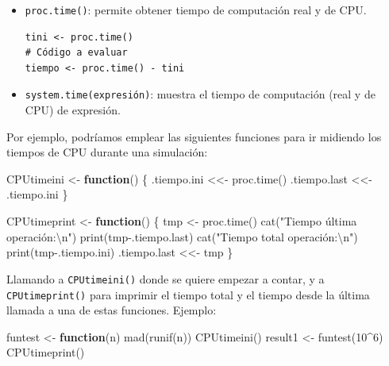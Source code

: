\documentclass[
]{book}
\newenvironment{Shaded}{\begin{snugshade}}{\end{snugshade}}
\newcommand{\ControlFlowTok}[1]{\textcolor[rgb]{0.13,0.29,0.53}{\textbf{#1}}}
\newcommand{\DecValTok}[1]{\textcolor[rgb]{0.00,0.00,0.81}{#1}}
\newcommand{\FunctionTok}[1]{\textcolor[rgb]{0.00,0.00,0.00}{#1}}
\newcommand{\NormalTok}[1]{#1}
\newcommand{\OtherTok}[1]{\textcolor[rgb]{0.56,0.35,0.01}{#1}}
\newcommand{\SpecialCharTok}[1]{\textcolor[rgb]{0.00,0.00,0.00}{#1}}
\newcommand{\StringTok}[1]{\textcolor[rgb]{0.31,0.60,0.02}{#1}}
\theoremstyle{break}
\theoremstyle{definition}
\theoremstyle{definition}
\theoremstyle{definition}
\theoremstyle{definition}
\theoremstyle{remark}
\begin{document}
\begin{itemize}
\item
  \texttt{proc.time()}: permite obtener tiempo de computación real y de
  CPU.

\begin{verbatim}
tini <- proc.time()
# Código a evaluar
tiempo <- proc.time() - tini
\end{verbatim}
\item
  \texttt{system.time(expresión)}: muestra el tiempo de computación (real y
  de CPU) de expresión.
\end{itemize}

Por ejemplo, podríamos emplear las siguientes funciones para
ir midiendo los tiempos de CPU durante una simulación:

\begin{Shaded}
\begin{Highlighting}[]
\NormalTok{CPUtimeini }\OtherTok{\textless{}{-}} \ControlFlowTok{function}\NormalTok{() \{}
\NormalTok{  .tiempo.ini }\OtherTok{\textless{}\textless{}{-}} \FunctionTok{proc.time}\NormalTok{()}
\NormalTok{  .tiempo.last }\OtherTok{\textless{}\textless{}{-}}\NormalTok{ .tiempo.ini}
\NormalTok{\}}

\NormalTok{CPUtimeprint }\OtherTok{\textless{}{-}} \ControlFlowTok{function}\NormalTok{() \{}
\NormalTok{  tmp }\OtherTok{\textless{}{-}} \FunctionTok{proc.time}\NormalTok{()}
  \FunctionTok{cat}\NormalTok{(}\StringTok{"Tiempo última operación:}\SpecialCharTok{\textbackslash{}n}\StringTok{"}\NormalTok{)}
  \FunctionTok{print}\NormalTok{(tmp}\SpecialCharTok{{-}}\NormalTok{.tiempo.last)}
  \FunctionTok{cat}\NormalTok{(}\StringTok{"Tiempo total operación:}\SpecialCharTok{\textbackslash{}n}\StringTok{"}\NormalTok{)}
  \FunctionTok{print}\NormalTok{(tmp}\SpecialCharTok{{-}}\NormalTok{.tiempo.ini)}
\NormalTok{  .tiempo.last }\OtherTok{\textless{}\textless{}{-}}\NormalTok{ tmp}
\NormalTok{\}}
\end{Highlighting}
\end{Shaded}

Llamando a \texttt{CPUtimeini()} donde se quiere empezar a contar,
y a \texttt{CPUtimeprint()} para imprimir el tiempo total
y el tiempo desde la última llamada a una de estas funciones.
Ejemplo:

\begin{Shaded}
\begin{Highlighting}[]
\NormalTok{funtest }\OtherTok{\textless{}{-}} \ControlFlowTok{function}\NormalTok{(n) }\FunctionTok{mad}\NormalTok{(}\FunctionTok{runif}\NormalTok{(n)) }
\FunctionTok{CPUtimeini}\NormalTok{()}
\NormalTok{result1 }\OtherTok{\textless{}{-}} \FunctionTok{funtest}\NormalTok{(}\DecValTok{10}\SpecialCharTok{\^{}}\DecValTok{6}\NormalTok{)}
\FunctionTok{CPUtimeprint}\NormalTok{()}
\end{Highlighting}
\end{Shaded}
\end{document}
